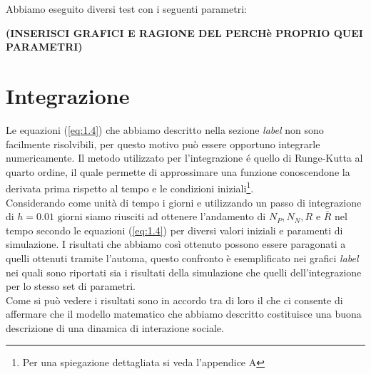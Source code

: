 Abbiamo eseguito diversi test con i seguenti parametri:

\textbf{(INSERISCI GRAFICI E RAGIONE DEL PERCHè PROPRIO QUEI PARAMETRI)}
\section{Integrazione}
Le equazioni (\ref{eq:1.4}) che abbiamo descritto nella sezione \emph{label} non sono facilmente risolvibili, per questo motivo può essere opportuno integrarle numericamente. Il metodo utilizzato per l'integrazione é quello di Runge-Kutta al quarto ordine, il quale permette di approssimare una funzione conoscendone la derivata prima rispetto al tempo e le condizioni iniziali\footnote{Per una spiegazione dettagliata si veda l'appendice A}. \\
Considerando come unità di tempo i giorni e utilizzando un passo di integrazione di $ h=0.01 \text{ giorni}$ siamo riusciti ad ottenere l'andamento di $ N_{P}, N_{N}, R$ e $\bar{R} $ nel tempo secondo le equazioni (\ref{eq:1.4}) per diversi valori iniziali e paramenti di simulazione.
I risultati che abbiamo così  ottenuto possono essere paragonati a quelli ottenuti tramite l'automa, questo confronto è esemplificato nei grafici \emph{label} nei quali sono riportati sia i risultati della simulazione che quelli dell'integrazione per lo stesso set di parametri.\\ 

Come si può vedere i risultati sono in accordo tra di loro il che ci consente di affermare che il modello matematico che abbiamo descritto costituisce una buona descrizione di una dinamica di interazione sociale.
